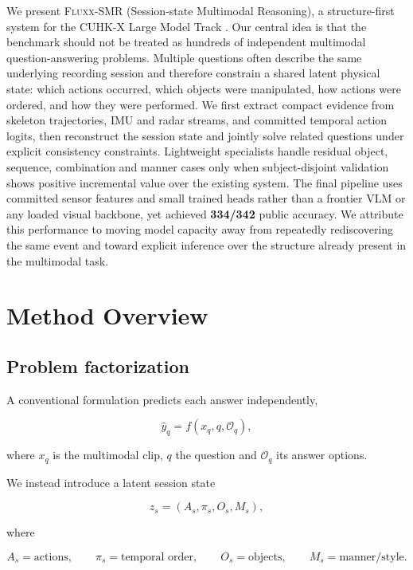 \documentclass[12pt,a4paper]{article}
\newcommand{\method}{\textsc{Fluxx-SMR}}
\newcommand{\score}{\textbf{334/342}}
\begin{document}
We present \method{} (Session-state Multimodal Reasoning), a structure-first
system for the CUHK-X Large Model Track \cite{cuhkx}.
Our central idea is that the benchmark should not be treated as hundreds of
independent multimodal question-answering problems. Multiple questions often
describe the same underlying recording session and therefore constrain a shared
latent physical state: which actions occurred, which objects were manipulated,
how actions were ordered, and how they were performed. We first extract compact
evidence from skeleton trajectories, IMU and radar streams, and committed
temporal action logits, then reconstruct the session state and jointly solve
related questions under explicit consistency constraints. Lightweight
specialists handle residual object, sequence, combination and manner cases
only when subject-disjoint validation shows positive incremental value over
the existing system. The final pipeline uses committed sensor features and
small trained heads rather than a frontier VLM or any loaded visual backbone,
yet achieved \score{} public accuracy. We attribute this
performance to moving model capacity away from repeatedly rediscovering the
same event and toward explicit inference over the structure already present in
the multimodal task.

\section{Method Overview}

\subsection{Problem factorization}

A conventional formulation predicts each answer independently,

\[
    \hat{y}_q = f(x_q,q,\mathcal{O}_q),
\]

where \(x_q\) is the multimodal clip, \(q\) the question and
\(\mathcal{O}_q\) its answer options.

We instead introduce a latent session state

\[
    z_s = (A_s,\pi_s,O_s,M_s),
\]

where

\[
    A_s = \text{actions},\qquad
    \pi_s = \text{temporal order},\qquad
    O_s = \text{objects},\qquad
    M_s = \text{manner/style}.
\]
\end{document}
